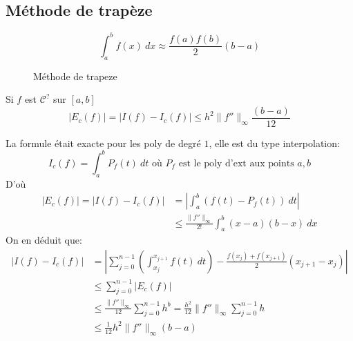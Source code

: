 \subsection{Méthode de trapèze}
\begin{definition}
    \[
        \int_{{a}}^{{b}} {f(x)} \: d{x} \approx \frac{f(a)f(b)}{2}(b - a)
    \] 
\begin{figure}[H]
    \centering
    \caption{Méthode de trapeze}
    \label{fig:methode-de-trapeze}
\end{figure}
\end{definition}
\begin{prop}
    Si $f$ est  $\mathcal{C}^{?}$ sur  $[a, b]$ 
    \[
        \left| E_c(f) \right| = \left| I(f) - I_c(f) \right| \le h^{2} \|f''\|_{\infty}\frac{(b - a)}{12}
    \] 
\end{prop}
\begin{preuve}
   La formule était exacte pour les poly de degré $1$, elle est du type interpolation:
   \[
   I_c(f) = \int_{{a}}^{{b}} {P_f(t)} \: d{t} \text{ où }  P_f \text{ est le poly d'ext aux points } a, b
   \] 
   D'où
   \begin{align*}
       \left| E_c(f) \right| = \left| I(f) - I_c(f) \right| &= \left| \int_{{a}}^{{b}} {(f(t) - P_f(t))} \: d{t} {} \right| \\
                                                            &\le  \frac{\|f''\|_{\infty}}{2!}\int_{{a}}^{{b}} {(x - a)(b - x)} \: d{x} {}
   \end{align*}
   On en déduit que:
   \begin{align*}
       \left| I(f) - I_c(f) \right| &= \left| \sum_{j=0}^{n-1} \left( \int_{{x_j}}^{{x_{j+1}}} {f(t)} \: d{t} \right) - \frac{f(x_j) + f(x_{j+1})}{2}(x_{j+1} - x_{j}) \right| \\
                                    &\le \sum_{j=0}^{n-1} |E_c(f)| \\
                                    &\le \frac{\|f''\|_{\infty}}{12}\sum_{j=0}^{n-1} h^b = \frac{h^2}{12}\|f''\|_{\infty}\sum_{j=0}^{n-1} h\\
                                    &\le \frac{1}{12}h^2 \|f''\|_{\infty}(b - a)
   \end{align*}
\end{preuve}

